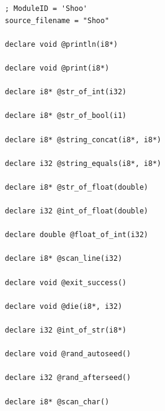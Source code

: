\documentclass[12pt]{article}
\begin{document}
\begin{mdframed}[hidealllines=true,backgroundcolor=green!10]
\begin{lstlisting}
; ModuleID = 'Shoo'
source_filename = "Shoo"

declare void @println(i8*)

declare void @print(i8*)

declare i8* @str_of_int(i32)

declare i8* @str_of_bool(i1)

declare i8* @string_concat(i8*, i8*)

declare i32 @string_equals(i8*, i8*)

declare i8* @str_of_float(double)

declare i32 @int_of_float(double)

declare double @float_of_int(i32)

declare i8* @scan_line(i32)

declare void @exit_success()

declare void @die(i8*, i32)

declare i32 @int_of_str(i8*)

declare void @rand_autoseed()

declare i32 @rand_afterseed()

declare i8* @scan_char()


\end{lstlisting}
\end{mdframed}
\end{document}
